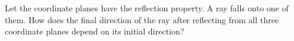 Let the coordinate planes have the reflection property. A ray falls onto one of them. How does the final direction of the ray after reflecting from all three coordinate planes depend on its initial direction?